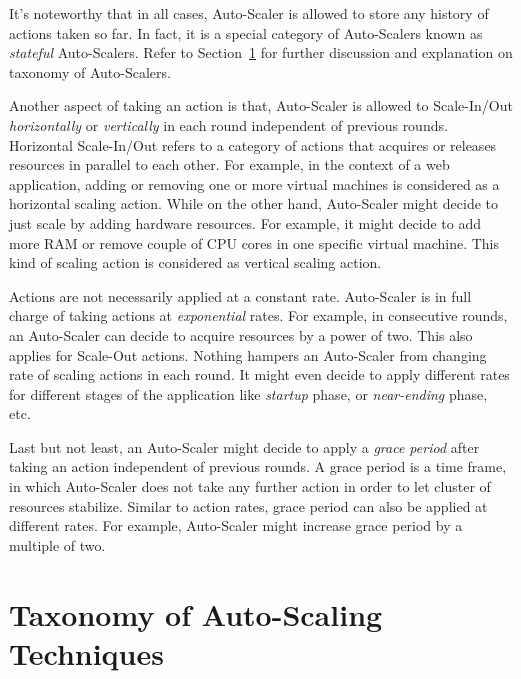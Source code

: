 It's noteworthy that in all cases, Auto-Scaler is allowed to store any history of actions taken so far. In fact, it is a special category of Auto-Scalers known as \emph{stateful} Auto-Scalers. Refer to Section~\ref{ias:taxonomy} for further discussion and explanation on taxonomy of Auto-Scalers.

Another aspect of taking an action is that, Auto-Scaler is allowed to Scale-In/Out \emph{horizontally} or \emph{vertically} in each round independent of previous rounds. Horizontal Scale-In/Out refers to a category of actions that acquires or releases resources in parallel to each other. For example, in the context of a web application, adding or removing one or more virtual machines is considered as a horizontal scaling action. While on the other hand, Auto-Scaler might decide to just scale by adding hardware resources. For example, it might decide to add more RAM or remove couple of CPU cores in one specific virtual machine. This kind of scaling action is considered as vertical scaling action.

Actions are not necessarily applied at a constant rate. Auto-Scaler is in full charge of taking actions at \emph{exponential} rates. For example, in consecutive rounds, an Auto-Scaler can decide to acquire resources by a power of two. This also applies for Scale-Out actions. Nothing hampers an Auto-Scaler from changing rate of scaling actions in each round. It might even decide to apply different rates for different stages of the application like \emph{startup} phase, or \emph{near-ending} phase, etc.

Last but not least, an Auto-Scaler might decide to apply a \emph{grace period} after taking an action independent of previous rounds. A grace period is a time frame, in which Auto-Scaler does not take any further action in order to let cluster of resources stabilize. Similar to action rates, grace period can also be applied at different rates. For example, Auto-Scaler might increase grace period by a multiple of two.

\section{Taxonomy of Auto-Scaling Techniques}
\label{ias:taxonomy}

